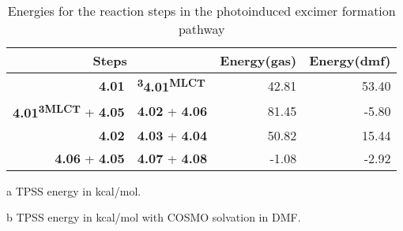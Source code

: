 \begin{table}[!htb]
\centering
 \begin{threeparttable}
  \caption{Energies for the reaction steps in the photoinduced excimer formation pathway}
    \begin{tabular}{r@{ $\rightarrow$ }lrr}
    \toprule
    \multicolumn{2}{c}{Steps} & Energy(gas)\tnote{a} & Energy(dmf)\tnote{b} \\
    \midrule
    \textbf{4.01} & \textbf{\textsuperscript{3}4.01\textsuperscript{MLCT}} & 42.81 & 53.40 \\
    \textbf{4.01\textsuperscript{3MLCT}} + \textbf{4.05} & \textbf{4.02} + \textbf{4.06} & 81.45 & -5.80 \\
    \textbf{4.02} & \textbf{4.03} + \textbf{4.04} & 50.82 & 15.44 \\
    \textbf{4.06} + \textbf{4.05} & \textbf{4.07} + \textbf{4.08} & -1.08 & -2.92 \\
    \bottomrule
    \end{tabular}%
    \begin{tablenotes}
    \item [a] TPSS energy in kcal/mol.
    \item [b] TPSS energy in kcal/mol with COSMO solvation in DMF.
    \end{tablenotes}
  \label{tab.suprxn}%
 \end{threeparttable}
\end{table}%


